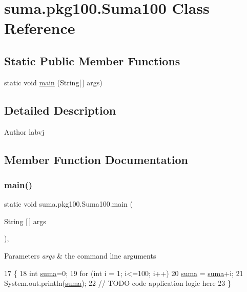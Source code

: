 \hypertarget{classsuma_1_1pkg100_1_1_suma100}{}\section{suma.\+pkg100.\+Suma100 Class Reference}
\label{classsuma_1_1pkg100_1_1_suma100}
\subsection*{Static Public Member Functions}
\begin{DoxyCompactItemize}
\item 
static void \mbox{\hyperlink{classsuma_1_1pkg100_1_1_suma100_a03fef71992d572856807c724227f3bff}{main}} (String\mbox{[}$\,$\mbox{]} args)
\end{DoxyCompactItemize}


\subsection{Detailed Description}
\begin{DoxyAuthor}{Author}
labvj 
\end{DoxyAuthor}


\subsection{Member Function Documentation}
\mbox{\label{classsuma_1_1pkg100_1_1_suma100_a03fef71992d572856807c724227f3bff}} 
\subsubsection{\texorpdfstring{main()}{main()}}
{\footnotesize\ttfamily static void suma.\+pkg100.\+Suma100.\+main (\begin{DoxyParamCaption}\item[{String \mbox{[}$\,$\mbox{]}}]{args }\end{DoxyParamCaption})\hspace{0.3cm}{\ttfamily [inline]}, {\ttfamily [static]}}


\begin{DoxyParams}{Parameters}
{\em args} & the command line arguments \\
\hline
\end{DoxyParams}

\begin{DoxyCode}
17                                            \{
18         \textcolor{keywordtype}{int} \mbox{\hyperlink{namespacesuma}{suma}}=0;
19         \textcolor{keywordflow}{for} (\textcolor{keywordtype}{int} i = 1; i<=100; i++)
20           \mbox{\hyperlink{namespacesuma}{suma}} = \mbox{\hyperlink{namespacesuma}{suma}}+i;
21       System.out.println(\mbox{\hyperlink{namespacesuma}{suma}});
22 \textcolor{comment}{// TODO code application logic here}
23     \}
\end{DoxyCode}
